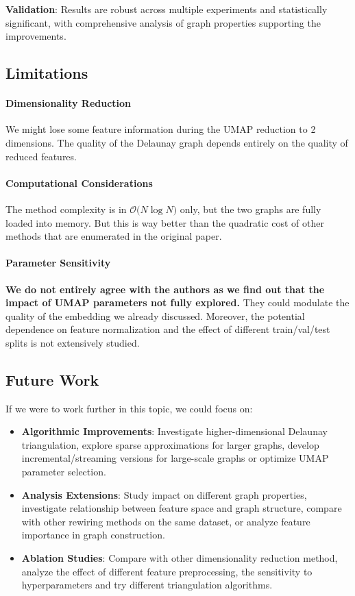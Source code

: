 \documentclass{article}
\theoremstyle{plain}
\theoremstyle{definition}
\theoremstyle{remark}
\begin{document}
\textbf{Validation}: Results are robust across multiple experiments and 
statistically significant, with comprehensive analysis of graph properties
supporting the improvements.

\subsection{Limitations}
\paragraph{Dimensionality Reduction} We might lose some feature information
    during the UMAP reduction to 2 dimensions. The quality of the Delaunay graph
    depends entirely on the quality of reduced features.

 \paragraph{Computational Considerations}
 The method complexity is in $\mathcal{O} \big( N \log N \big)$ only, but the 
 two graphs are  fully loaded into memory. But this is way better than the quadratic cost
 of other methods that are enumerated in the original paper.
   
\paragraph{Parameter Sensitivity} \textbf{We do not entirely agree with the authors as
we find out that the impact of UMAP parameters not fully explored.} They could
modulate the quality of the embedding we already discussed. Moreover, the
potential dependence on feature normalization and the effect of different
 train/val/test splits is not extensively studied.

\subsection{Future Work}
If we were to work further in this topic, we could focus on:
\begin{itemize}
    \item \textbf{Algorithmic Improvements}: Investigate higher-dimensional 
    Delaunay triangulation, explore sparse approximations for larger graphs, 
   develop incremental/streaming versions for large-scale graphs or 
   optimize UMAP parameter selection.

    \item \textbf{Analysis Extensions}:
   Study impact on different graph properties, 
   investigate relationship between feature space and graph structure,
   compare with other rewiring methods on the same dataset,
   or analyze feature importance in graph construction.

    \item \textbf{Ablation Studies}:
   Compare with other dimensionality reduction method, analyze the effect of different 
   feature preprocessing, the sensitivity to hyperparameters and try different
    triangulation algorithms.
\end{itemize}
\end{document}

